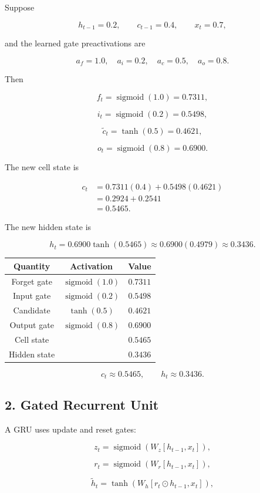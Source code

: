 \documentclass[11pt,a4paper,twoside]{article}
\newcommand{\sigmoid}{\operatorname{sigmoid}}
\begin{document}
Suppose

\[
h_{t-1}=0.2,
\qquad
c_{t-1}=0.4,
\qquad
x_t=0.7,
\]

and the learned gate preactivations are

\[
a_f=1.0,
\quad a_i=0.2,
\quad a_c=0.5,
\quad a_o=0.8.
\]

Then

\[
f_t=\sigmoid(1.0)=0.7311,
\]

\[
i_t=\sigmoid(0.2)=0.5498,
\]

\[
\tilde c_t=\tanh(0.5)=0.4621,
\]

\[
o_t=\sigmoid(0.8)=0.6900.
\]

The new cell state is

\[
\begin{aligned}
c_t
&=0.7311(0.4)+0.5498(0.4621)\\
&=0.2924+0.2541\\
&=0.5465.
\end{aligned}
\]

The new hidden state is

\[
h_t=0.6900\tanh(0.5465)
\approx0.6900(0.4979)
\approx0.3436.
\]

\begin{center}
\begin{tabular}{c|c|c}
\toprule
Quantity&Activation&Value\\ \midrule
Forget gate&$\sigmoid(1.0)$&$0.7311$\\
Input gate&$\sigmoid(0.2)$&$0.5498$\\
Candidate&$\tanh(0.5)$&$0.4621$\\
Output gate&$\sigmoid(0.8)$&$0.6900$\\
Cell state&&$0.5465$\\
Hidden state&&$0.3436$\\ \bottomrule
\end{tabular}
\end{center}

\[
\boxed{c_t\approx0.5465,\qquad h_t\approx0.3436.}
\]

\subsection*{2. Gated Recurrent Unit}

A GRU uses update and reset gates:

\[
z_t=\sigmoid(W_z[h_{t-1},x_t]),
\]

\[
r_t=\sigmoid(W_r[h_{t-1},x_t]),
\]

\[
\tilde h_t=\tanh(W_h[r_t\odot h_{t-1},x_t]),
\]
\end{document}
